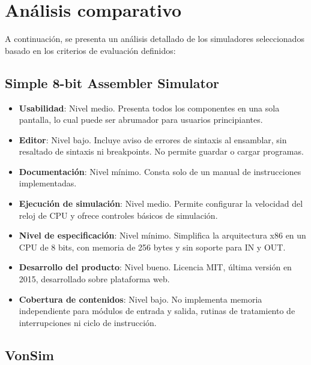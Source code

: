 \documentclass[12pt,twoside]{templates/unerthesis}
\providecommand{\tightlist}{%
  \setlength{\itemsep}{0pt}\setlength{\parskip}{0pt}}
\begin{document}
\hypertarget{anuxe1lisis-comparativo}{%
\section{Análisis comparativo}\label{anuxe1lisis-comparativo}}

A continuación, se presenta un análisis detallado de los simuladores seleccionados basado en los criterios de evaluación definidos:

\hypertarget{simple-8-bit-assembler-simulator}{%
\subsection{Simple 8-bit Assembler Simulator}\label{simple-8-bit-assembler-simulator}}

\begin{itemize}
\tightlist
\item
  \textbf{Usabilidad}: Nivel medio. Presenta todos los componentes en una sola pantalla, lo cual puede ser abrumador para usuarios principiantes.
\item
  \textbf{Editor}: Nivel bajo. Incluye aviso de errores de sintaxis al ensamblar, sin resaltado de sintaxis ni breakpoints. No permite guardar o cargar programas.
\item
  \textbf{Documentación}: Nivel mínimo. Consta solo de un manual de instrucciones implementadas.
\item
  \textbf{Ejecución de simulación}: Nivel medio. Permite configurar la velocidad del reloj de CPU y ofrece controles básicos de simulación.
\item
  \textbf{Nivel de especificación}: Nivel mínimo. Simplifica la arquitectura x86 en un CPU de 8 bits, con memoria de 256 bytes y sin soporte para IN y OUT.
\item
  \textbf{Desarrollo del producto}: Nivel bueno. Licencia MIT, última versión en 2015, desarrollado sobre plataforma web.
\item
  \textbf{Cobertura de contenidos}: Nivel bajo. No implementa memoria independiente para módulos de entrada y salida, rutinas de tratamiento de interrupciones ni ciclo de instrucción.
\end{itemize}

\hypertarget{vonsim}{%
\subsection{VonSim}\label{vonsim}}
\end{document}
